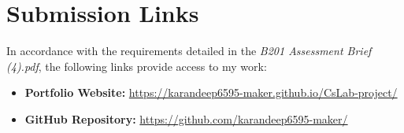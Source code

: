 \documentclass{article}
\begin{document}
\section{Submission Links}
In accordance with the requirements detailed in the \textit{B201 Assessment Brief (4).pdf}, the following links provide access to my work:
\begin{itemize}
    \item \textbf{Portfolio Website:} \url{https://karandeep6595-maker.github.io/CsLab-project/}
    \item \textbf{GitHub Repository:} \url{https://github.com/karandeep6595-maker/}
\end{itemize}
\end{document}
